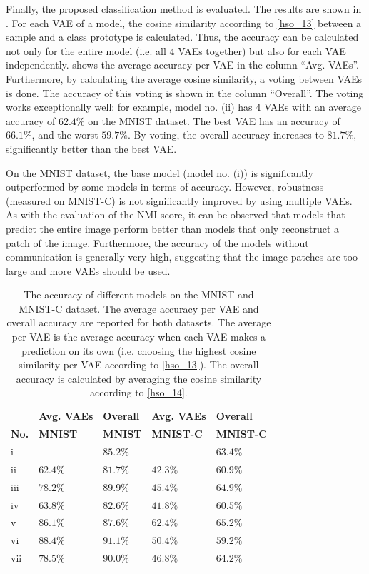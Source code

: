Finally, the proposed classification method is evaluated. The results are shown in .
For each VAE of a model, the cosine similarity according to \eqref{hso_13} between a sample and a class prototype is calculated. Thus, the accuracy can be calculated not only for the entire model (i.e. all $4$ VAEs together) but also for each VAE independently.  shows the average accuracy per VAE in the column ``Avg. VAEs''. Furthermore, by calculating the average cosine similarity, a voting between VAEs is done. The accuracy of this voting is shown in the column ``Overall''. The voting works exceptionally well: for example, model no. (ii) has $4$ VAEs with an average accuracy of $62.4\%$ on the MNIST dataset. The best VAE has an accuracy of $66.1\%$, and the worst $59.7\%$. By voting, the overall accuracy increases to $81.7\%$, significantly better than the best VAE.

On the MNIST dataset, the base model (model no. (i)) is significantly outperformed by some models in terms of accuracy. However, robustness (measured on MNIST-C) is not significantly improved by using multiple VAEs. As with the evaluation of the NMI score, it can be observed that models that predict the entire image perform better than models that only reconstruct a patch of the image. Furthermore, the accuracy of the models without communication is generally very high, suggesting that the image patches are too large and more VAEs should be used.



\begin{table}[h] 
    \centering
	 \begin{tabular}{l l l l l}
	 	& \textbf{Avg. VAEs} & \textbf{Overall} & \textbf{Avg. VAEs} & \textbf{Overall}\\
    	\textbf{No.} & \textbf{MNIST} & \textbf{MNIST} & \textbf{MNIST-C} & \textbf{MNIST-C}\\
        \hline
		i & - & $85.2\%$ & - & $63.4\%$ \\
		ii & $62.4\%$ & $81.7\%$ & $42.3\%$ & $60.9\%$ \\
		iii & $78.2\%$ & $89.9\%$ & $45.4\%$ & $64.9\%$ \\
		iv & $63.8\%$ & $82.6\%$ & $41.8\%$ & $60.5\%$  \\
		v & $86.1\%$ & $87.6\%$ & $62.4\%$ & $65.2\%$ \\
		vi & $88.4\%$ & $91.1\%$ & $50.4\%$ & $59.2\%$ \\
		vii & $78.5\%$ & $90.0\%$ & $46.8\%$ & $64.2\%$ \\
    \end{tabular}
    \caption[Accuracy of different architectures]{The accuracy of different models on the MNIST and MNIST-C dataset. The average accuracy per VAE and overall accuracy are reported for both datasets. The average per VAE is the average accuracy when each VAE makes a prediction on its own (i.e. choosing the highest cosine similarity per VAE according to \eqref{hso_13}). The overall accuracy is calculated by averaging the cosine similarity according to \eqref{hso_14}.}
\end{table}

